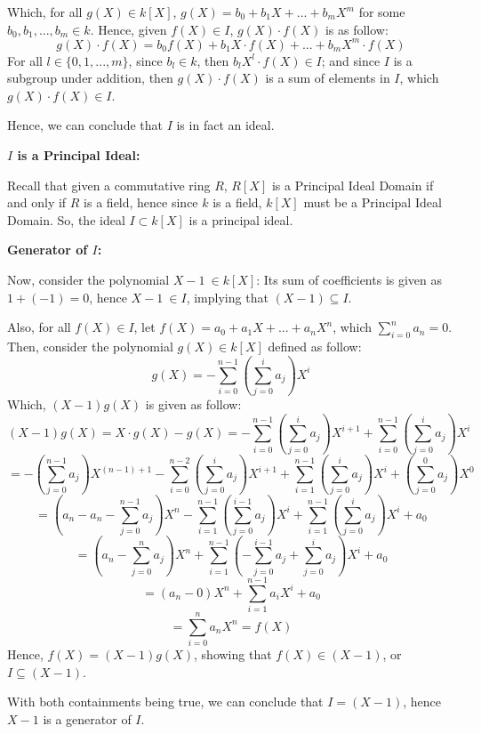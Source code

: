 \documentclass{article}
\begin{document}
\hfill

Which, for all $g(X)\in k[X]$, $g(X)=b_0+b_1X+...+b_mX^m$ for some $b_0,b_1,...,b_m\in k$. Hence, given $f(X)\in I$, $g(X)\cdot f(X)$ is as follow:
$$g(X)\cdot f(X)= b_0f(X)+b_1X\cdot f(X)+...+b_mX^m\cdot f(X)$$
For all $l\in\{0,1,...,m\}$, since $b_l\in k$, then $b_lX^l\cdot f(X) \in I$; and since $I$ is a subgroup under addition, then $g(X)\cdot f(X)$ is a sum of elements in $I$, 
which $g(X)\cdot f(X)\in I$.

Hence, we can conclude that $I$ is in fact an ideal.

\hfill

\hfill

\textbf{$I$ is a Principal Ideal:}

Recall that given a commutative ring $R$, $R[X]$ is a Principal Ideal Domain if and only if $R$ is a field, hence since $k$ is a field, $k[X]$ must be a Principal Ideal Domain.
So, the ideal $I\subset k[X]$ is a principal ideal.

\hfill

\textbf{Generator of $I$:}

Now, consider the polynomial $X-1\ \in k[X]$: Its sum of coefficients is given as $1+(-1)=0$, hence $X-1\ \in I$, implying that $(X-1)\subseteq I$.

Also, for all $f(X)\in I$, let $f(X)=a_0+a_1X+...+a_nX^n$, which $\sum_{i=0}^{n}a_n=0$. Then, consider the polynomial $g(X)\in k[X]$ defined as follow:
$$g(X)=-\sum_{i=0}^{n-1}\left(\sum_{j=0}^{i}a_j\right)X^i$$
Which, $(X-1)g(X)$ is given as follow:
$$(X-1)g(X)= X\cdot g(X)-g(X) = -\sum_{i=0}^{n-1}\left(\sum_{j=0}^{i}a_j\right)X^{i+1}+\sum_{i=0}^{n-1}\left(\sum_{j=0}^{i}a_j\right)X^i$$
$$ = -\left(\sum_{j=0}^{n-1}a_j\right)X^{(n-1)+1} - \sum_{i=0}^{n-2}\left(\sum_{j=0}^{i}a_j\right)X^{i+1} + \sum_{i=1}^{n-1}\left(\sum_{j=0}^{i}a_j\right)X^i + \left(\sum_{j=0}^{0}a_j\right)X^0$$
$$ = \left(a_n-a_n-\sum_{j=0}^{n-1}a_j\right)X^n - \sum_{i=1}^{n-1}\left(\sum_{j=0}^{i-1}a_j\right)X^i + \sum_{i=1}^{n-1}\left(\sum_{j=0}^{i}a_j\right)X^i + a_0$$
$$ = \left(a_n-\sum_{j=0}^{n}a_j\right)X^n + \sum_{i=1}^{n-1}\left(-\sum_{j=0}^{i-1}a_j+\sum_{j=0}^{i}a_j\right)X^i + a_0$$
$$ = (a_n-0)X^n + \sum_{i=1}^{n-1}a_iX^i + a_0$$
$$= \sum_{i=0}^{n}a_nX^n = f(X)$$
Hence, $f(X)=(X-1)g(X)$, showing that $f(X)\in (X-1)$, or $I\subseteq (X-1)$.

\hfill

With both containments being true, we can conclude that $I=(X-1)$, hence $X-1$ is a generator of $I$.
\end{document}
